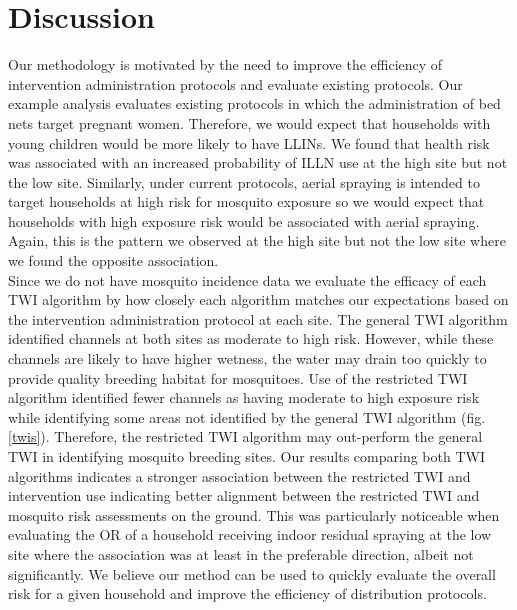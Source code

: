 \documentclass{article}\usepackage[]{graphicx}\usepackage[]{color}
\begin{document}
{%


\section{Discussion}
Our methodology is motivated by the need to improve the efficiency of intervention administration protocols and evaluate existing protocols.  Our example analysis evaluates existing protocols in which the administration of bed nets target pregnant women.  Therefore,  we would expect that households with young children would be more likely to have LLINs.  We found that health risk was associated with an increased probability of ILLN use at the high site but not the low site.  Similarly, under current protocols, aerial spraying is intended to target households at high risk for mosquito exposure  so we would expect that households with high exposure risk would be associated with aerial spraying.  Again,  this is the pattern we observed at the high site but not the low site where we found the opposite association.\\

Since we do not have mosquito incidence data we evaluate the efficacy of each TWI algorithm by how closely each algorithm matches our expectations based on the intervention administration protocol at each site.  The general TWI algorithm identified channels at both sites as moderate to high risk.  However, while these channels are likely to have higher wetness, the water may drain too quickly to provide quality breeding habitat for mosquitoes.  Use of the restricted TWI algorithm identified fewer channels as having moderate to high exposure risk while identifying some areas not identified by the general TWI algorithm (fig. \ref{twis}).  Therefore, the restricted TWI algorithm may out-perform the general TWI in identifying mosquito breeding sites.  Our results comparing both TWI algorithms indicates a stronger association between the restricted TWI and intervention use indicating better alignment between the restricted TWI and mosquito risk assessments on the ground. This was particularly noticeable when evaluating the OR of a household receiving indoor residual spraying at the low site where the association was at least in the preferable direction, albeit not significantly.  We believe our method can be used to quickly evaluate the overall risk for a given household and improve the efficiency of distribution protocols.\\

}
\end{document}
